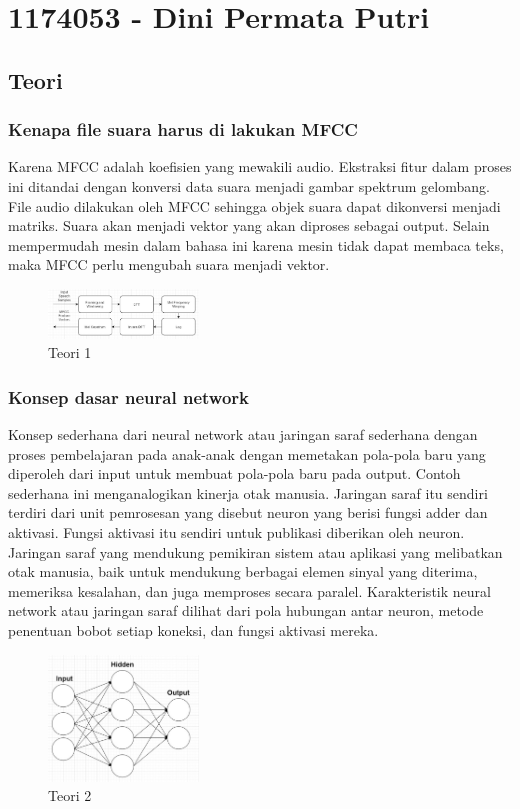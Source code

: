\section{1174053 - Dini Permata Putri}
\subsection{Teori}
\subsubsection{Kenapa file suara harus di lakukan MFCC}
\hfill\break
Karena MFCC adalah koefisien yang mewakili audio. Ekstraksi fitur dalam proses ini ditandai dengan konversi data suara menjadi gambar spektrum gelombang. File audio dilakukan oleh MFCC sehingga objek suara dapat dikonversi menjadi matriks. Suara akan menjadi vektor yang akan diproses sebagai output. Selain mempermudah mesin dalam bahasa ini karena mesin tidak dapat membaca teks, maka MFCC perlu mengubah suara menjadi vektor.
\begin{figure}[H]
\centering
	\includegraphics[width=4cm]{figures/1174053/6/1.jpg}
\caption{Teori 1}
\end{figure}

\subsubsection{Konsep dasar neural network}
\hfill\break
Konsep sederhana dari neural network atau jaringan saraf sederhana dengan proses pembelajaran pada anak-anak dengan memetakan pola-pola baru yang diperoleh dari input untuk membuat pola-pola baru pada output. Contoh sederhana ini menganalogikan kinerja otak manusia. Jaringan saraf itu sendiri terdiri dari unit pemrosesan yang disebut neuron yang berisi fungsi adder dan aktivasi. Fungsi aktivasi itu sendiri untuk publikasi diberikan oleh neuron. Jaringan saraf yang mendukung pemikiran sistem atau aplikasi yang melibatkan otak manusia, baik untuk mendukung berbagai elemen sinyal yang diterima, memeriksa kesalahan, dan juga memproses secara paralel. Karakteristik neural network atau jaringan saraf dilihat dari pola hubungan antar neuron, metode penentuan bobot setiap koneksi, dan fungsi aktivasi mereka.
\begin{figure}[H]
\centering
	\includegraphics[width=4cm]{figures/1174053/6/2.jpg}
\caption{Teori 2}
\end{figure}

